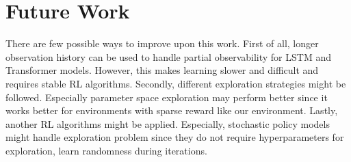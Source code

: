 \section{Future Work}
\label{sec:future_work}

There are few possible ways to improve upon this work. First of all, longer observation history can be used to handle partial observability for LSTM and Transformer models. However, this makes learning slower and difficult and requires stable RL algorithms. Secondly, different exploration strategies might be followed. Especially parameter space exploration \cite{plappert_parameter_2018} may perform better since it works better for environments with sparse reward like our environment. 
Lastly, another RL algorithms might be applied. Especially, stochastic policy models might handle exploration problem since they do not require hyperparameters for exploration, learn randomness during iterations.